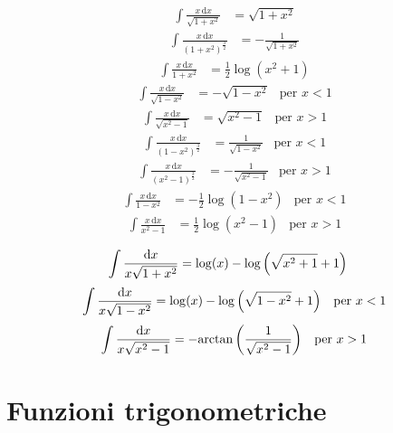 \documentclass[10pt,a4paper]{article}
\newcommand{\de}{{\ensuremath{ \mbox{d}}}}
\begin{document}
\begin{multicols}{2}
  \begin{align*}
    \int \frac{x \, \de x}{\sqrt{1 + x^2}} & = \sqrt{1 + x^2}
  \end{align*}
  \begin{align*}
    \int \frac{x \, \de x}{(1 + x^2)^{\frac{3}{2}}} & = - \frac{1}{\sqrt{1 + x^2}} 
  \end{align*}
  \begin{align*}
    \int \frac{x \, \de x}{1 + x^2} & = \frac{1}{2} \log(x^2 + 1)
  \end{align*}
  \begin{align*}
    \int \frac{x \, \de x}{\sqrt{1 - x^2}} & = - \sqrt{1 - x^2} & \text{per } x < 1
  \end{align*}
  \begin{align*}
    \int \frac{x \, \de x}{\sqrt{x^2 - 1}} & = \sqrt{x^2 - 1} & \text{per } x > 1
  \end{align*}
  \begin{align*}
    \int \frac{x \, \de x}{(1 - x^2)^{\frac{3}{2}}} & = \frac{1}{\sqrt{1 - x^2}} & \text{per } x < 1
  \end{align*}
  \begin{align*}
    \int \frac{x \, \de x}{(x^2 - 1)^{\frac{3}{2}}} & = - \frac{1}{\sqrt{x^2 - 1}} & \text{per } x > 1
  \end{align*}
  \begin{align*}
    \int \frac{x \, \de x}{1 - x^2} & = - \frac{1}{2} \log(1 - x^2) & \text{per } x < 1
  \end{align*}
  \begin{align*}
    \int \frac{x \, \de x}{x^2 - 1} & = \frac{1}{2} \log(x^2 - 1) & \text{per } x > 1
  \end{align*}

  \begin{align*}
    \int \frac{\de x}{x \sqrt{1 + x^2}} & = \log(x) - \log\lrt{\sqrt{x^2 + 1} + 1}
  \end{align*}
  \begin{align*}
    \int \frac{\de x}{x \sqrt{1 - x^2}} & = \log(x) - \log\lrt{\sqrt{1 - x^2} + 1} & \text{per } x < 1
  \end{align*}
  \begin{align*}
    \int \frac{\de x}{x \sqrt{x^2 - 1}} & = - \text{arctan}\lrt{\frac{1}{\sqrt{x^2 - 1}}} & \text{per } x > 1
  \end{align*}
  
  \section*{Funzioni trigonometriche}

\end{multicols}
\end{document}
